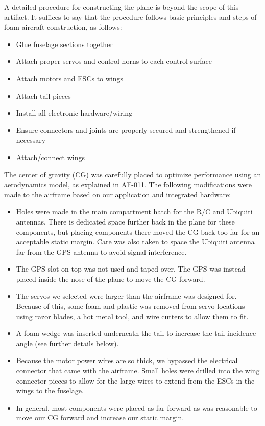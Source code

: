 \documentclass[]{auvsi_doc}
\begin{document}
A detailed procedure for constructing the plane is beyond the scope of this artifact. It suffices to say that the procedure follows basic principles and steps of foam aircraft construction, as follows:

\begin{itemize}
	\item Glue fuselage sections together
	\item Attach proper servos and control horns to each control surface
	\item Attach motors and ESCs to wings
	\item Attach tail pieces
	\item Install all electronic hardware/wiring
	\item Ensure connectors and joints are properly secured and strengthened if necessary
	\item Attach/connect wings
\end{itemize}

The center of gravity (CG) was carefully placed to optimize performance using an aerodynamics model, as explained in AF-011. The following modifications were made to the airframe based on our application and integrated hardware:

\begin{itemize}
	\item Holes were made in the main compartment hatch for the R/C and Ubiquiti antennas. There is dedicated space further back in the plane for these components, but placing components there moved the CG back too far for an acceptable static margin. Care was also taken to space the Ubiquiti antenna far from the GPS antenna to avoid signal interference.
	\item The GPS slot on top was not used and taped over. The GPS was instead placed inside the nose of the plane to move the CG forward.
	\item The servos we selected were larger than the airframe was designed for. Because of this, some foam and plastic was removed from servo locations using razor blades, a hot metal tool, and wire cutters to allow them to fit.
	\item A foam wedge was inserted underneath the tail to increase the tail incidence angle (see further details below).
	\item Because the motor power wires are so thick, we bypassed the electrical connector that came with the airframe. Small holes were drilled into the wing connector pieces to allow for the large wires to extend from the ESCs in the wings to the fuselage. 
	\item In general, most components were placed as far forward as was reasonable to move our CG forward and increase our static margin. 
\end{itemize}
\end{document}
